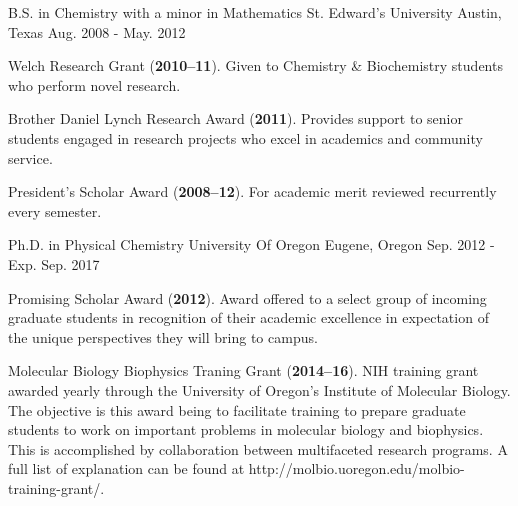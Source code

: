 
%
%

\begin{cventries}
  \cventry
    {B.S. in Chemistry with a minor in Mathematics} %
    {St. Edward's University} %
    {Austin, Texas} %
    {Aug. 2008 - May. 2012} %
    {
      \begin{cvitems} %
        \item{Welch Research Grant (\textbf{2010--11}). Given to Chemistry \& Biochemistry students who perform novel research.}
        \item{Brother Daniel Lynch Research Award (\textbf{2011}). Provides support to senior students engaged in research projects who excel in academics and community service.}
        \item{President's Scholar Award (\textbf{2008--12}). For academic merit reviewed recurrently every semester.}
      \end{cvitems}
    }

  \cventry
    {Ph.D. in Physical Chemistry} %
    {University Of Oregon} %
    {Eugene, Oregon} %
    {Sep. 2012 - Exp. Sep. 2017} %
    {
      \begin{cvitems}
        \item{Promising Scholar Award (\textbf{2012}). Award offered to a select group of incoming graduate students in recognition of their academic excellence in expectation of the unique perspectives they will bring to campus.}
        \item{Molecular Biology Biophysics Traning Grant (\textbf{2014--16}). NIH training grant awarded yearly through the University of Oregon’s Institute of Molecular Biology. The objective is this award being to facilitate training to prepare graduate students to work on important problems in molecular biology and biophysics. This is accomplished by collaboration between multifaceted research programs. A full list of explanation can be found at http://molbio.uoregon.edu/molbio-training-grant/.}
      \end{cvitems}
    }
\end{cventries}
